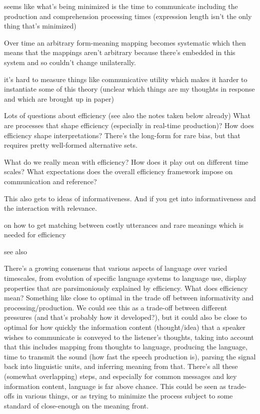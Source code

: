 \documentclass[]{article}
\begin{document}
seems like what's being minimized is the time to communicate including the production and comprehension processing times (expression length isn't the only thing that's minimized)

Over time an arbitrary form-meaning mapping becomes systematic which then means that the mappings aren't arbitrary because there's embedded in this system and so couldn't change unilaterally. 

\cite{gibson2019} it's hard to measure things like communicative utility which makes it harder to instantiate some of this theory (unclear which things are my thoughts in response and which are brought up in paper) 


Lots of questions about efficiency (see also the notes taken below already)
What are processes that shape efficiency (especially in real-time production)? How does efficiency shape interpretations? There's the long-form for rare bias, but that requires pretty well-formed alternative sets. 

What do we really mean with efficiency? How does it play out on different time scales? What expectations does the overall efficiency framework impose on communication and reference? 

This also gets to ideas of informativeness. And if you get into informativeness and the interaction with relevance. 

\cite{bergen} on how to get matching between costly utterances and rare meanings which is needed for efficiency

see also \cite{zipf1949}


There's a growing consensus that various aspects of language over varied timescales, from evolution of specific language systems to language use, display properties that are parsimoniously explained by efficiency. What does efficiency mean? Something like close to optimal in the trade off between informativity and processing/production. We could see this as a trade-off between different pressures (and that's probably how it developed?), but it could also be close to optimal for how quickly the information content (thought/idea) that a speaker wishes to communicate is conveyed to the listener's thoughts, taking into account that this includes mapping from thoughts to language, producing the language, time to transmit the sound (how fast the speech production is), parsing the signal back into linguistic units, and inferring meaning from that. There's all these (somewhat overlapping) steps, and especially for common messages and key information content, language is far above chance. This could be seen as trade-offs in various things, or as trying to minimize the process subject to some standard of close-enough on the meaning front. 
\end{document}
